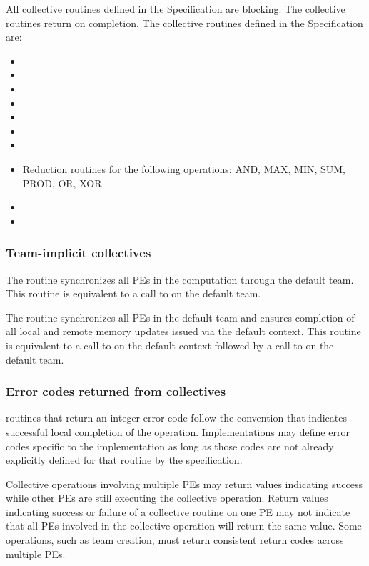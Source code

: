 \begin{DeprecateBlock}
All collective routines defined in the Specification are blocking.  The
collective routines return on completion.  The  collective
routines defined in the \openshmem Specification are:

\begin{itemize}
\item {}
\item {}
\item {}
\item {}
\item {}
\item {}
\item {}
\item Reduction routines for the following operations: AND, MAX, MIN, SUM, PROD, OR, XOR
\item {}
\item {}
\end{itemize}

\end{DeprecateBlock}

{\color{Green}

\subsubsection*{Team-implicit collectives}

The  routine synchronizes all \acp{PE} in the
computation through the default team. This routine is equivalent to a
call to  on the default team.

The  routine synchronizes all \acp{PE} in
the default team and ensures completion of all local and remote memory
updates issued via the default context.  This routine is equivalent to
a call to  on the default context followed by a
call to  on the default team.

\subsubsection*{Error codes returned from collectives}

\CorCpp routines that return an integer error code follow the
convention that  indicates successful local completion of the
operation. Implementations may define error codes specific to the
implementation as long as those codes are not already explicitly
defined for that routine by the \openshmem specification.

Collective operations involving multiple \acp{PE} may return values
indicating success while other \acp{PE} are still executing the
collective operation. Return values indicating success or failure of a
collective routine on one \ac{PE} may not indicate that all \acp{PE}
involved in the collective operation will return the same value. Some
operations, such as team creation, must return consistent return codes
across multiple \acp{PE}.

}
